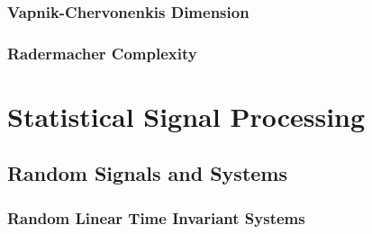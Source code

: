 \documentclass[11pt]{report} %
\begin{document}
\subsection{Vapnik-Chervonenkis Dimension}

\subsection{Radermacher Complexity}

\chapter{Statistical Signal Processing}

\section{Random Signals and Systems}

\subsection{Random Linear Time Invariant Systems}
\end{document}
